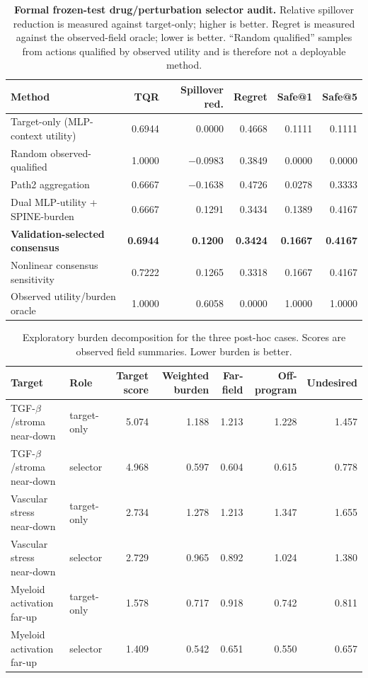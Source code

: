 \documentclass[sigconf,review,balance=false]{acmart}
\begin{document}
\begin{table}[t]
\centering
\small
\caption{\textbf{Formal frozen-test drug/perturbation selector audit.}
Relative spillover reduction is measured against target-only; higher is better.
Regret is measured against the observed-field oracle; lower is better.
``Random qualified'' samples from actions qualified by observed utility and is
therefore not a deployable method.}
\label{tab:app_selector_formal}
\setlength{\tabcolsep}{4.5pt}
\begin{tabular}{@{}lrrrrr@{}}
\toprule
Method & TQR & Spillover red. & Regret & Safe@1 & Safe@5 \\
\midrule
Target-only (MLP-context utility) & 0.6944 & 0.0000 & 0.4668 & 0.1111 & 0.1111 \\
Random observed-qualified & 1.0000 & $-0.0983$ & 0.3849 & 0.0000 & 0.0000 \\
Path2 aggregation & 0.6667 & $-0.1638$ & 0.4726 & 0.0278 & 0.3333 \\
Dual MLP-utility + SPINE-burden & 0.6667 & 0.1291 & 0.3434 & 0.1389 & 0.4167 \\
\textbf{Validation-selected consensus} & \textbf{0.6944} & \textbf{0.1200} &
\textbf{0.3424} & \textbf{0.1667} & \textbf{0.4167} \\
Nonlinear consensus sensitivity & 0.7222 & 0.1265 & 0.3318 & 0.1667 & 0.4167 \\
Observed utility/burden oracle & 1.0000 & 0.6058 & 0.0000 & 1.0000 & 1.0000 \\
\bottomrule
\end{tabular}
\end{table}

\begin{table}[t]
\centering
\small
\caption{Exploratory burden decomposition for the three post-hoc cases. Scores
are observed field summaries. Lower burden is better.}
\label{tab:app_selector_burden_decomposition}
\begin{tabular}{llrrrrr}
\toprule
Target & Role & Target score & Weighted burden & Far-field & Off-program & Undesired \\
\midrule
TGF-$\beta$/stroma near-down & target-only & 5.074 & 1.188 & 1.213 & 1.228 & 1.457 \\
TGF-$\beta$/stroma near-down & selector & 4.968 & 0.597 & 0.604 & 0.615 & 0.778 \\
Vascular stress near-down & target-only & 2.734 & 1.278 & 1.213 & 1.347 & 1.655 \\
Vascular stress near-down & selector & 2.729 & 0.965 & 0.892 & 1.024 & 1.380 \\
Myeloid activation far-up & target-only & 1.578 & 0.717 & 0.918 & 0.742 & 0.811 \\
Myeloid activation far-up & selector & 1.409 & 0.542 & 0.651 & 0.550 & 0.657 \\
\bottomrule
\end{tabular}
\end{table}
\end{document}
